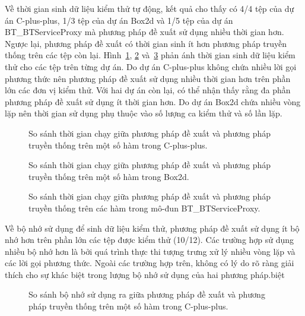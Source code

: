 Về thời gian sinh dữ liệu kiểm thử tự động, kết quả cho thấy có 4/4 tệp của dự án C-plus-plus, 1/3 tệp của dự án Box2d và 1/5 tệp của dự án BT\_BTServiceProxy mà phương pháp đề xuất sử dụng nhiều thời gian hơn. Ngược lại, phương pháp đề xuất có thời gian sinh ít hơn phương pháp truyền thống trên các tệp còn lại. Hình~\ref{fig:time-algo}, \ref{fig:time-box2d} và~\ref{fig:time-serviceproxy} phản ánh thời gian sinh dữ liệu kiểm thử cho các tệp trên từng dự án. Do dự án C-plus-plus không chứa nhiều lời gọi phương thức nên phương pháp đề xuất sử dụng nhiều thời gian hơn trên phần lớn các đơn vị kiểm thử. Với hai dự án còn lại, có thể nhận thấy rằng đa phần phương pháp đề xuất sử dụng ít thời gian hơn. Do dự án Box2d chứa nhiều vòng lặp nên thời gian sử dụng phụ thuộc vào số lượng ca kiểm thử và số lần lặp.

\begin{figure}[H]
    \centering
    
    \caption{So sánh thời gian chạy giữa phương pháp đề xuất và phương pháp truyền thống trên một số hàm trong C-plus-plus.}
    \label{fig:time-algo}
\end{figure}

\begin{figure}[H]
	\centering
	
	\caption{So sánh thời gian chạy giữa phương pháp đề xuất và phương pháp truyền thống trên một số hàm trong Box2d.}
	\label{fig:time-box2d}
\end{figure}

\begin{figure}[H]
	\centering
	
	\caption{So sánh thời gian chạy giữa phương pháp đề xuất và phương pháp truyền thống trên các hàm trong mô-đun BT\_BTServiceProxy.}
	\label{fig:time-serviceproxy}
\end{figure}

Về bộ nhớ sử dụng để sinh dữ liệu kiểm thử, phương pháp đề xuất sử dụng ít bộ nhớ hơn trên phần lớn các tệp được kiểm thử (10/12). Các trường hợp sử dụng nhiều bộ nhớ hơn là bởi quá trình thực thi tượng trưng xử lý nhiều vòng lặp và các lời gọi phương thức. Ngoài các trường hợp trên, không có lý do rõ ràng giải thích cho sự khác biệt trong lượng bộ nhớ sử dụng của hai phương pháp.biệt

\begin{figure}[H]
    \centering
    
    \caption{So sánh bộ nhớ sử dụng ra giữa phương pháp đề xuất và phương pháp truyền thống trên một số hàm trong C-plus-plus.}
    \label{fig:mem-algo}
\end{figure}

